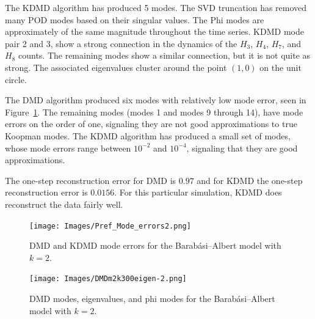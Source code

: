 The KDMD algorithm has produced 5 modes. The SVD truncation has removed many POD modes based on their singular values.
The Phi modes are approximately
of the same magnitude throughout the time series. KDMD mode pair 2 and 3, show 
a strong connection in the dynamics of the $H_{3}$, $H_{4}$, $H_{7}$, and $H_{8}$ counts. The remaining modes show 
a similar connection, but it is not quite as strong. The associated eigenvalues cluster around 
the point $(1,0)$ on the unit circle.

The DMD algorithm produced six modes with relatively low mode error, seen in Figure~\ref{fig:BA2modeerrors}.
The remaining modes (modes 1 and modes 9 through 14), have mode errors on the order of one, signaling they 
are not good approximations to true Koopman modes. The KDMD algorithm has produced a small set of modes,
whose mode errors range between $10^{-2}$ and $10^{-4}$, signaling that they are good approximations.

The one-step reconstruction error for DMD is $0.97$ and for KDMD the one-step reconstruction error is $0.0156$. For this 
particular simulation, KDMD does reconstruct the data fairly well.

\begin{figure}
    \texttt{[image: Images/Pref\_Mode\_errors2.png]}
    \centering
    \caption{DMD and KDMD mode errors for the Barabási–Albert model
    with $k=2$. \label{fig:BA2modeerrors}}
\end{figure}



\begin{figure}
    \texttt{[image: Images/DMDm2k300eigen-2.png]}
    \centering
    \caption{DMD modes, eigenvalues, and phi modes for the Barabási–Albert model
    with $k=2$. \label{fig:DMDBA2}}
\end{figure}


